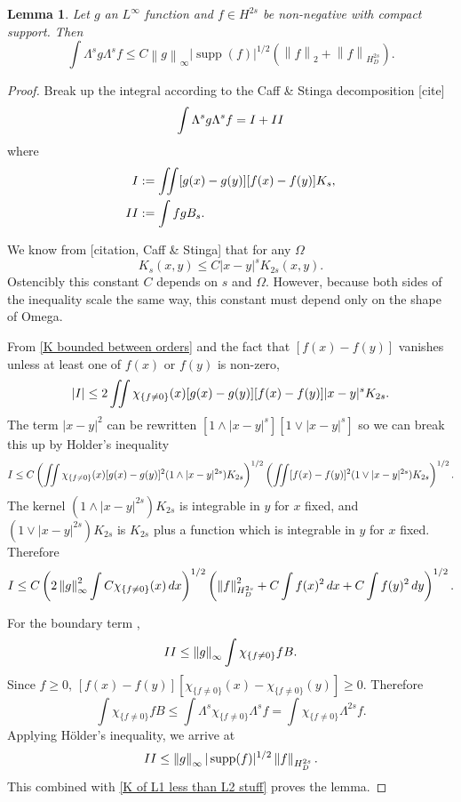 \documentclass[11pt]{amsart}
\newtheorem{lemma}[theorem]{Lemma}
\theoremstyle{remark}
\theoremstyle{definition}
\newcommand{\norm}[1]{\left\lVert#1\right\rVert}
\newcommand{\paren}[1]{\left( #1 \right)}
\newcommand{\abs}[1]{\left\lvert #1 \right\rvert}
\DeclareMathOperator{\supp}{supp}
\newcommand{\indic}[1]{\chi_{\{#1\}}}
\newcommand{\Rom}[1]{\MakeUppercase{\romannumeral #1}}
\begin{document}
\begin{lemma} \label{thm:L1 of Lambda bounded}
Let $g$ an $L^\infty$ function and $f \in H^{2s}$ be non-negative with compact support.  Then
\[ \int \Lambda^s g \Lambda^s f \leq C \norm{g}_\infty |\supp(f)|^{1/2} \paren{ \norm{f}_2 + \norm{f}_{H_D^{2s}}}. \]
\end{lemma}

\begin{proof}
Break up the integral according to the Caff \& Stinga decomposition [cite]
\[ \int \Lambda^s g \Lambda^s f = \Rom{1} + \Rom{2} \]
where
\begin{align*} 
\Rom{1} &:= \iint [g(x)-g(y)][f(x)-f(y)] K_s, \\
\Rom{2} &:= \int f g B_s. 
\end{align*}

We know from [citation, Caff \& Stinga] that for any $\Omega$
\begin{equation} \label{K bounded between orders} K_s(x,y) \leq C |x-y|^s K_{2s}(x,y). \end{equation}
Ostencibly this constant $C$ depends on $s$ and $\Omega$.  However, because both sides of the inequality scale the same way, this constant must depend only on the shape of Omega.  

From \eqref{K bounded between orders} and the fact that $[f(x)-f(y)]$ vanishes unless at least one of $f(x)$ or $f(y)$ is non-zero,
\[ \abs{\Rom{1}} \leq 2 \iint \indic{f \neq 0}(x) [g(x)-g(y)] [f(x)-f(y)] |x-y|^s K_{2s}. \]
The term $|x-y|^2$ can be rewritten $[1 \wedge |x-y|^s] [1 \vee |x-y|^s]$ so we can break this up by Holder's inequality
\[ \Rom{1} \leq C \paren{\iint \indic{f \neq 0}(x) [g(x)-g(y)]^2 (1 \wedge |x-y|^{2s}) K_{2s} }^{1/2} \paren{\iint [f(x)-f(y)]^2 (1 \vee |x-y|^{2s}) K_{2s} }^{1/2}. \]
The kernel $(1 \wedge |x-y|^{2s}) K_{2s}$ is integrable in $y$ for $x$ fixed, and $(1 \vee |x-y|^{2s}) K_{2s}$ is $K_{2s}$ plus a function which is integrable in $y$ for $x$ fixed.  Therefore
\begin{equation} \label{K of L1 less than L2 stuff} \Rom{1} \leq C \paren{ 2\norm{g}_\infty^2 \int C \indic{f\neq 0}(x) \,dx }^{1/2} \paren{ \norm{f}_{H^{2s}_D}^2 + C \int f(x)^2 \,dx + C \int f(y)^2 \,dy}^{1/2}. \end{equation}

For the boundary term \Rom{2}, 
\[ \Rom{2} \leq \norm{g}_\infty \int\indic{f\neq 0} f B. \]
Since $f \geq 0$, $[f(x)-f(y)][\indic{f \neq 0}(x) - \indic{f \neq 0}(y)] \geq 0$.  Therefore
\[ \int \indic{f \neq 0} f B \leq \int \Lambda^s \indic{f \neq 0} \Lambda^s f = \int \indic{f\neq 0} \Lambda^{2s} f. \]
Applying H\"{o}lder's inequality, we arrive at
\[ \Rom{2} \leq \norm{g}_\infty |\supp(f)|^{1/2} \norm{f}_{H_D^{2s}}. \]
This combined with \eqref{K of L1 less than L2 stuff} proves the lemma.  
\end{proof}
\end{document}
